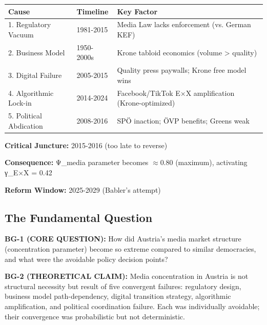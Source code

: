\begin{tcolorbox}[colback=yellow!5!white, colframe=yellow!75!black,
    title=Quick Reference: Five Causes of Austrian Concentration]

\begin{tabular}{@{}llp{6cm}@{}}
\textbf{Cause} & \textbf{Timeline} & \textbf{Key Factor} \\
\midrule
1. Regulatory Vacuum & 1981-2015 & Media Law lacks enforcement (vs. German KEF) \\
2. Business Model & 1950-2000s & Krone tabloid economics (volume > quality) \\
3. Digital Failure & 2005-2015 & Quality press paywalls; Krone free model wins \\
4. Algorithmic Lock-in & 2014-2024 & Facebook/TikTok E×X amplification (Krone-optimized) \\
5. Political Abdication & 2008-2016 & SPÖ inaction; ÖVP benefits; Greens weak \\
\end{tabular}

\textbf{Critical Juncture:} 2015-2016 (too late to reverse)

\textbf{Consequence:} Ψ_media parameter becomes $\approx$0.80 (maximum), activating γ_{E×X} = 0.42

\textbf{Reform Window:} 2025-2029 (Babler's attempt)

\end{tcolorbox}


\subsection*{The Fundamental Question}

\textbf{BG-1 (CORE QUESTION):} How did Austria's media market structure (concentration parameter) become
so extreme compared to similar democracies, and what were the avoidable policy decision points?

\textbf{BG-2 (THEORETICAL CLAIM):} Media concentration in Austria is not structural necessity but result
of five convergent failures: regulatory design, business model path-dependency, digital transition strategy,
algorithmic amplification, and political coordination failure. Each was individually avoidable; their convergence
was probabilistic but not deterministic.

